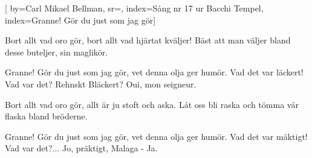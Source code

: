 

[ 		%
	by={Carl Mikael Bellman},					%
	sr={},					%
	index={Sång nr 17 ur Bacchi Tempel}, %
	index={Granne! Gör du just som jag gör}]						%
	
\beginverse*						%
Bort allt vad oro gör,
bort allt vad hjärtat kväljer!
Bäst att man väljer bland desse buteljer,
sin maglikör.
\endverse							%

\beginchorus						%
Granne! Gör du just som jag gör,
vet denna olja ger humör.
Vad det var läckert!
Vad var det? Rehnskt Bläckert?
Oui, mon seigneur.
\endchorus						%

\beginverse*						%
Bort allt vad oro gör,
allt är ju stoft och aska.
Låt oss bli raska
och tömma vår flaska
bland bröderne.
\endverse							%

\beginchorus						%
Granne! Gör du just som jag gör,
vet denna olja ger humör.
Vad det var mäktigt!
Vad var det?... Jo, präktigt,
Malaga - Ja.
\endchorus


\endsong							%